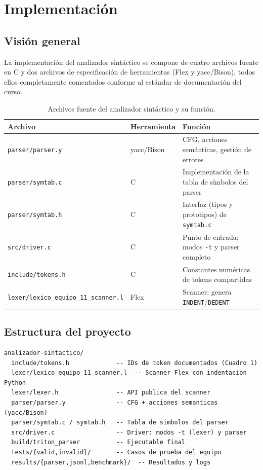 \section{Implementación}

\subsection{Visión general}

La implementación del analizador sintáctico se compone de cuatro archivos fuente en C y dos archivos de especificación de herramientas (Flex y yacc/Bison), todos ellos completamente comentados conforme al estándar de documentación del curso.

\begin{table}[H]
\centering
\caption{Archivos fuente del analizador sintáctico y su función.}
\label{tab:archivos}
\begin{tabular}{@{}llp{6.5cm}@{}}
\toprule
\textbf{Archivo} & \textbf{Herramienta} & \textbf{Función} \\
\midrule
\texttt{parser/parser.y} & yacc/Bison & CFG, acciones semánticas, gestión de errores \\
\texttt{parser/symtab.c} & C & Implementación de la tabla de símbolos del parser \\
\texttt{parser/symtab.h} & C & Interfaz (tipos y prototipos) de \texttt{symtab.c} \\
\texttt{src/driver.c}    & C & Punto de entrada; modos \texttt{-t} y parser completo \\
\texttt{include/tokens.h}& C & Constantes numéricas de tokens compartidas \\
\texttt{lexer/lexico\_equipo\_11\_scanner.l} & Flex & Scanner; genera \texttt{INDENT}/\texttt{DEDENT} \\
\bottomrule
\end{tabular}
\end{table}

\subsection{Estructura del proyecto}
\begin{verbatim}
analizador-sintactico/
  include/tokens.h             -- IDs de token documentados (Cuadro 1)
  lexer/lexico_equipo_11_scanner.l  -- Scanner Flex con indentacion Python
  lexer/lexer.h                -- API publica del scanner
  parser/parser.y              -- CFG + acciones semanticas (yacc/Bison)
  parser/symtab.c / symtab.h   -- Tabla de simbolos del parser
  src/driver.c                 -- Driver: modos -t (lexer) y parser
  build/triton_parser          -- Ejecutable final
  tests/{valid,invalid}/       -- Casos de prueba del equipo
  results/{parser,jsonl,benchmark}/  -- Resultados y logs
\end{verbatim}

